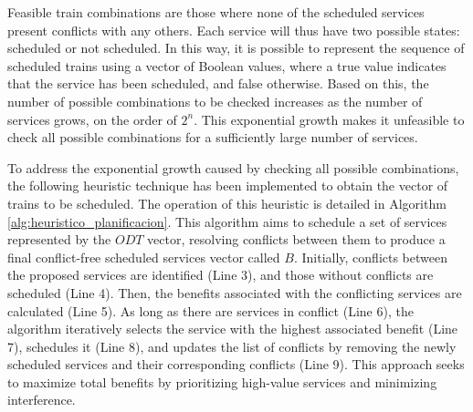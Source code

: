 \documentclass[Afour,sagev,times]{sagej}
\begin{document}
Feasible train combinations are those where none of the scheduled services present conflicts with any others. Each service will thus have two possible states: scheduled or not scheduled. In this way, it is possible to represent the sequence of scheduled trains using a vector of Boolean values, where a true value indicates that the service has been scheduled, and false otherwise. Based on this, the number of possible combinations to be checked increases as the number of services grows, on the order of $2^n$. This exponential growth makes it unfeasible to check all possible combinations for a sufficiently large number of services.

To address the exponential growth caused by checking all possible combinations, the following heuristic technique has been implemented to obtain the vector of trains to be scheduled. The operation of this heuristic is detailed in Algorithm \ref{alg:heuristico_planificacion}. This algorithm aims to schedule a set of services represented by the $ODT$ vector, resolving conflicts between them to produce a final conflict-free scheduled services vector called $B$. Initially, conflicts between the proposed services are identified (Line 3), and those without conflicts are scheduled (Line 4). Then, the benefits associated with the conflicting services are calculated (Line 5). As long as there are services in conflict (Line 6), the algorithm iteratively selects the service with the highest associated benefit (Line 7), schedules it (Line 8), and updates the list of conflicts by removing the newly scheduled services and their corresponding conflicts (Line 9). This approach seeks to maximize total benefits by prioritizing high-value services and minimizing interference.

\end{document}
